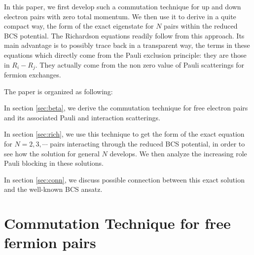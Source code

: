 \documentclass[aps,prb,amsmath,amssymb,preprint,superscriptaddress]{revtex4-1}
\begin{document}
In this paper, we first develop such a commutation technique for up and down electron pairs with zero total momentum.  We then use it to derive in a quite compact way, the form of the exact eigenstate for $N$ pairs within the reduced BCS potential. The Richardson equations readily follow from this approach.  Its main advantage is to possibly trace back in a transparent way, the terms in these equations which directly come from the Pauli exclusion principle: they are those in $R_i-R_j$. They actually come from the non zero value of Pauli scatterings for fermion exchanges. 

The paper is organized as following:

In section \ref{sec:beta}, we derive the commutation technique for free electron pairs and its associated Pauli and interaction scatterings.  

In section \ref{sec:rich}, we use this technique to get the form of the exact equation for $N=2,3,\cdots$ pairs interacting through the reduced BCS potential, in order to see how the solution for general $N$ develops. We then analyze the increasing role Pauli blocking in these solutions.

In section \ref{sec:conn}, we discuss possible connection between this exact solution and the well-known BCS ansatz.  
\section{Commutation Technique for free fermion pairs\label{sec:beta}}
\end{document}
